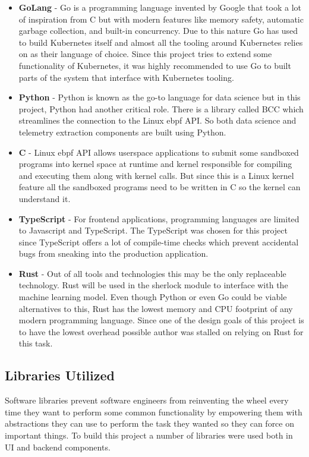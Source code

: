 \begin{itemize}
    \item \textbf{GoLang} - Go is a programming language invented by Google that took a lot of inspiration from C but with modern features like memory safety, automatic garbage collection, and built-in concurrency. Due to this nature Go has used to build Kubernetes itself and almost all the tooling around Kubernetes relies on as their language of choice. Since this project tries to extend some functionality of Kubernetes, it was highly recommended to use Go to built parts of the system that interface with Kubernetes tooling.
    \item \textbf{Python} - Python is known as the go-to language for data science but in this project, Python had another critical role. There is a library called BCC which streamlines the connection to the Linux \ac{ebpf} API. So both data science and telemetry extraction components are built using Python.
    \item \textbf{C} - Linux \ac{ebpf} API allows userspace applications to submit some sandboxed programs into kernel space at runtime and kernel responsible for compiling and executing them along with kernel calls. But since this is a Linux kernel feature all the sandboxed programs need to be written in C so the kernel can understand it.
    \item \textbf{TypeScript} - For frontend applications, programming languages are limited to Javascript and TypeScript. The TypeScript was chosen for this project since TypeScript offers a lot of compile-time checks which prevent accidental bugs from sneaking into the production application.
    \item \textbf{Rust} - Out of all tools and technologies this may be the only replaceable technology. Rust will be used in the \ac{sherlock} module to interface with the machine learning model. Even though Python or even Go could be viable alternatives to this, Rust has the lowest memory and CPU footprint of any modern programming language. Since one of the design goals of this project is to have the lowest overhead possible author was stalled on relying on Rust for this task.
\end{itemize}



\subsection{Libraries Utilized}
Software libraries prevent software engineers from reinventing the wheel every time they want to perform some common functionality by empowering them with abstractions they can use to perform the task they wanted so they can force on important things. To build this project a number of libraries were used both in UI and backend components.


